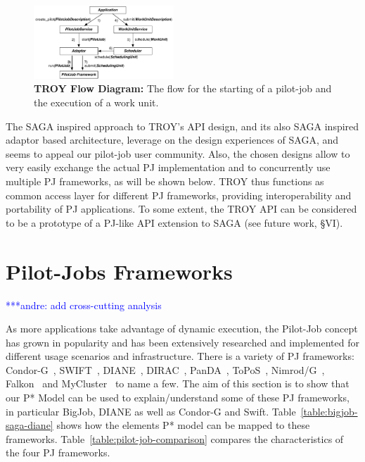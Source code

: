 \documentclass[conference,final]{IEEEtran}
\newcommand{\alnote}[1]{ {\textcolor{blue} { ***andre: #1 }}}
\newcommand{\alnote}[1]{}
\newcommand{\upp}{\vspace*{-0.5em}}
\begin{document}
\begin{figure}[t]
	\centering
		\includegraphics[width=0.47\textwidth]{figures/troy_flow.pdf}
	\caption{\textbf{TROY Flow Diagram:} The flow for the starting of a 
	pilot-job and the execution of a work unit.
	}
	\label{fig:figures_troy_flow}
\end{figure}

The SAGA inspired approach to TROY's API design, and its also SAGA
inspired adaptor based architecture, leverage on the design
experiences of SAGA, and seems to appeal our pilot-job user community.
Also, the chosen designs allow to very easily exchange the actual PJ
implementation and to concurrently use multiple PJ frameworks, as
will be shown below.  TROY thus functions as common access layer for
different PJ frameworks, providing interoperability and
portability of PJ applications.  To some extent, the TROY API can be
considered to be a prototype of a PJ-like API extension to SAGA (see
future work, \S{VI}).


\section{Pilot-Jobs Frameworks\upp\upp}
\alnote{add cross-cutting analysis}

As more applications take advantage of dynamic execution, the
Pilot-Job concept has grown in popularity and has been extensively
researched and implemented for different usage scenarios and
infrastructure. There is a variety of PJ frameworks:
Condor-G~\cite{condor-g}, SWIFT~\cite{Wilde2011},
DIANE~\cite{Moscicki:908910}, DIRAC~\cite{1742-6596-219-6-062049},
PanDA~\cite{1742-6596-219-6-062041}, ToPoS~\cite{topos},
Nimrod/G~\cite{10.1109/HPC.2000.846563}, Falkon~\cite{1362680} and
MyCluster~\cite{1652061} to name a few. The aim of this section is to
show that our P* Model can be used to explain/understand some of these
PJ frameworks, in particular BigJob, DIANE as well as Condor-G and
Swift.  Table~\ref{table:bigjob-saga-diane} shows how the elements P*
model can be mapped to these
frameworks. Table~\ref{table:pilot-job-comparison} compares the
characteristics of the four PJ frameworks.
\end{document}
